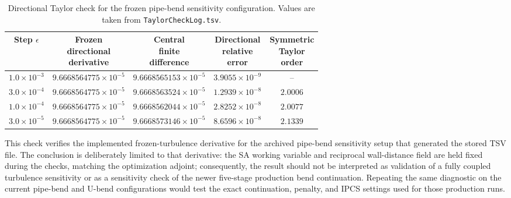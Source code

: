 \begin{table}[!ht]
	\centering
	\scriptsize
	\caption{Directional Taylor check for the frozen pipe-bend sensitivity configuration. Values are taken from \texttt{TaylorCheckLog.tsv}.}
	\label{tab:alexandersen_pipebend_taylor_check}
	\renewcommand{\arraystretch}{1.2}
	\begin{tabular}{c c c c c}
		\hline
		\textbf{Step $\epsilon$} &
		\shortstack{\textbf{Frozen}\\\textbf{directional}\\\textbf{derivative}} &
		\shortstack{\textbf{Central}\\\textbf{finite}\\\textbf{difference}} &
		\shortstack{\textbf{Directional}\\\textbf{relative}\\\textbf{error}} &
		\shortstack{\textbf{Symmetric}\\\textbf{Taylor}\\\textbf{order}} \\
		\hline
		$1.0\times10^{-3}$ & $9.6668564775\times10^{-5}$ & $9.6668565153\times10^{-5}$ & $3.9055\times10^{-9}$ & -- \\
		$3.0\times10^{-4}$ & $9.6668564775\times10^{-5}$ & $9.6668563524\times10^{-5}$ & $1.2939\times10^{-8}$ & $2.0006$ \\
		$1.0\times10^{-4}$ & $9.6668564775\times10^{-5}$ & $9.6668562044\times10^{-5}$ & $2.8252\times10^{-8}$ & $2.0077$ \\
		$3.0\times10^{-5}$ & $9.6668564775\times10^{-5}$ & $9.6668573146\times10^{-5}$ & $8.6596\times10^{-8}$ & $2.1339$ \\
		\hline
	\end{tabular}
\end{table}

	This check verifies the implemented frozen-turbulence derivative for the archived pipe-bend sensitivity setup that generated the stored TSV file. The conclusion is deliberately limited to that derivative: the SA working variable and reciprocal wall-distance field are held fixed during the checks, matching the optimization adjoint; consequently, the result should not be interpreted as validation of a fully coupled turbulence sensitivity or as a sensitivity check of the newer five-stage production bend continuation. Repeating the same diagnostic on the current pipe-bend and U-bend configurations would test the exact continuation, penalty, and IPCS settings used for those production runs.

\FloatBarrier

